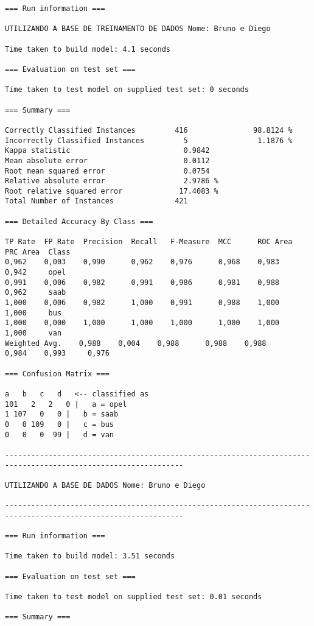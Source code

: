 \documentclass[
	article,			%
	11pt,				%
	oneside,			%
	a4paper,			%
	english,			%
	brazil,				%
	sumario=tradicional
	]{abntex2}
\begin{document}
\begin{lstlisting}
=== Run information ===

UTILIZANDO A BASE DE TREINAMENTO DE DADOS Nome: Bruno e Diego

Time taken to build model: 4.1 seconds

=== Evaluation on test set ===

Time taken to test model on supplied test set: 0 seconds

=== Summary ===

Correctly Classified Instances         416               98.8124 %
Incorrectly Classified Instances         5                1.1876 %
Kappa statistic                          0.9842
Mean absolute error                      0.0112
Root mean squared error                  0.0754
Relative absolute error                  2.9786 %
Root relative squared error             17.4083 %
Total Number of Instances              421     

=== Detailed Accuracy By Class ===

TP Rate  FP Rate  Precision  Recall   F-Measure  MCC      ROC Area  PRC Area  Class
0,962    0,003    0,990      0,962    0,976      0,968    0,983     0,942     opel
0,991    0,006    0,982      0,991    0,986      0,981    0,988     0,962     saab
1,000    0,006    0,982      1,000    0,991      0,988    1,000     1,000     bus
1,000    0,000    1,000      1,000    1,000      1,000    1,000     1,000     van
Weighted Avg.    0,988    0,004    0,988      0,988    0,988      0,984    0,993     0,976     

=== Confusion Matrix ===

a   b   c   d   <-- classified as
101   2   2   0 |   a = opel
1 107   0   0 |   b = saab
0   0 109   0 |   c = bus
0   0   0  99 |   d = van

---------------------------------------------------------------------------------------------------------------

UTILIZANDO A BASE DE DADOS Nome: Bruno e Diego

---------------------------------------------------------------------------------------------------------------

=== Run information ===

Time taken to build model: 3.51 seconds

=== Evaluation on test set ===

Time taken to test model on supplied test set: 0.01 seconds

=== Summary ===


\end{lstlisting}
\end{document}
